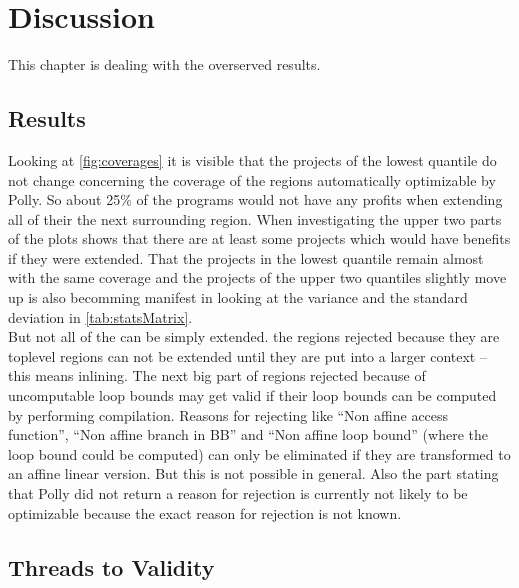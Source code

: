 \chapter{Discussion}
This chapter is dealing with the overserved results.

\section{Results}
Looking at \autoref{fig:coverages} it is visible that the projects of the lowest quantile do not change concerning the coverage of the regions automatically optimizable by Polly.
So about 25\% of the programs would not have any profits when extending all of their \scops the next surrounding region.
When investigating the upper two parts of the plots shows that there are at least some projects which would have benefits if they were extended.
That the projects in the lowest quantile remain almost with the same coverage and the projects of the upper two quantiles slightly move up is also becomming manifest in looking at the variance and the standard deviation in \autoref{tab:statsMatrix}.\\
But not all of the \scops can be simply extended.
\Eg the regions rejected because they are toplevel regions can not be extended until they are put into a larger context -- this means inlining.
The next big part of regions rejected because of uncomputable loop bounds may get valid if their loop bounds can be computed \eg by performing \jit compilation.
Reasons for rejecting like \enquote{Non affine access function}, \enquote{Non affine branch in BB} and \enquote{Non affine loop bound} (where the loop bound could be computed) can only be eliminated if they are transformed to an affine linear version.
But this is not possible in general. 
Also the part stating that Polly did not return a reason for rejection is currently not likely to be optimizable because the exact reason for rejection is not known.

\section{Threads to Validity}
